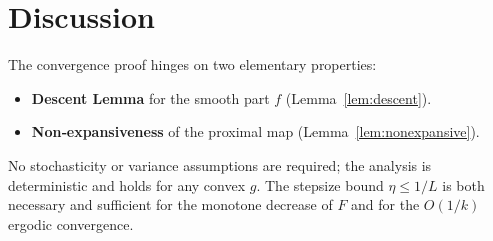 \documentclass{article}
\begin{document}
\section*{Discussion}
The convergence proof hinges on two elementary properties:

\begin{itemize}
\item \textbf{Descent Lemma} for the smooth part $f$ (Lemma~\ref{lem:descent}).
\item \textbf{Non‑expansiveness} of the proximal map (Lemma~\ref{lem:nonexpansive}).
\end{itemize}
No stochasticity or variance assumptions are required; the analysis is deterministic and holds for any convex $g$. The stepsize bound $\eta\le1/L$ is both necessary and sufficient for the monotone decrease of $F$ and for the $O(1/k)$ ergodic convergence.
\end{document}
